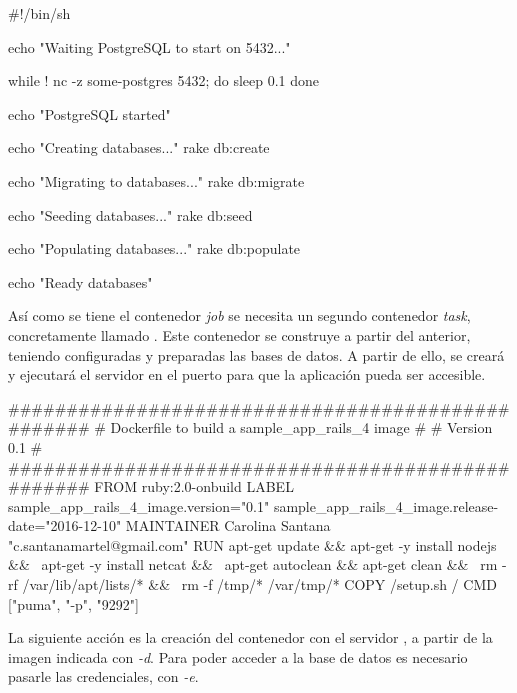 \begin{codelisting}
\label{code:dockerfile}
\begin{code}
#!/bin/sh

echo "Waiting PostgreSQL to start on 5432..."

while ! nc -z some-postgres 5432; do
  sleep 0.1
done

echo "PostgreSQL started"

echo "Creating databases..."
rake db:create

echo "Migrating to databases..."
rake db:migrate

echo "Seeding databases..."
rake db:seed

echo "Populating databases..."
rake db:populate

echo "Ready databases"

\end{code}
\end{codelisting}

Así como se tiene el contenedor \textit{job} se necesita un segundo contenedor \textit{task}, concretamente llamado . Este contenedor se construye a partir del anterior, teniendo configuradas y preparadas las bases de datos. A partir de ello, se creará y ejecutará el servidor  en el puerto  para que la aplicación pueda ser accesible.

\begin{codelisting}
\label{code:dockerfile}
\begin{code}
##################################################
# Dockerfile to build a sample_app_rails_4 image #
# Version 0.1                                    #
##################################################
FROM ruby:2.0-onbuild
LABEL sample_app_rails_4_image.version="0.1" sample_app_rails_4_image.release-date="2016-12-10"
MAINTAINER Carolina Santana "c.santanamartel@gmail.com"
RUN apt-get update && apt-get -y install nodejs && \
    apt-get -y install netcat && \
    apt-get autoclean && apt-get clean && \
    rm -rf /var/lib/apt/lists/* && \
    rm -f /tmp/* /var/tmp/*
COPY /setup.sh /
CMD ["puma", "-p", "9292"]
\end{code}
\end{codelisting}

La siguiente acción es la creación del contenedor  con el servidor , a partir de la imagen  indicada con \textit{\--d}. Para poder acceder a la base de datos es necesario pasarle las credenciales, con \textit{\--e}. 

